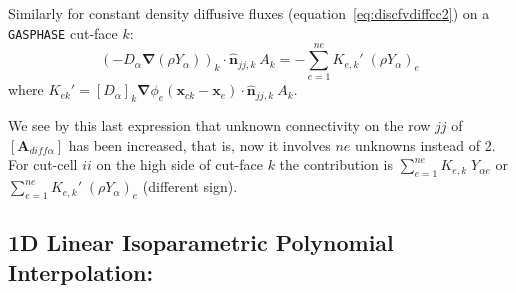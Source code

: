 Similarly for constant density diffusive fluxes (equation~\eqref{eq:discfvdiffcc2}) on a \texttt{GASPHASE} cut-face $k$:
%
\begin{equation}
   \left( - D_\alpha \boldsymbol{\nabla} \left( \rho Y_\alpha \right) \right)_k \cdot \hat{\mathbf{n}}_{jj,k} \: A_k = - \sum^{ne}_{e=1} K_{e,k}' \; \left( \rho Y_{\alpha} \right)_e \label{eq:kekdiff2}
\end{equation}
%
where $K_{ek}' = [D_\alpha]_k \boldsymbol{\nabla} \phi_e(\mathbf{x}_{ck}-\mathbf{x}_e) \cdot \hat{\mathbf{n}}_{jj,k} \: A_k$.

We see by this last expression that unknown connectivity on the row $jj$ of $\left[ \mathbf{A}_{diff \alpha} \right]$ has been increased, that is, now it involves $ne$ unknowns instead of 2. For cut-cell $ii$ on the high side of cut-face $k$ the contribution is $\sum^{ne}_{e=1} K_{e,k} \; Y_{\alpha e}$ or  $\sum^{ne}_{e=1} K_{e,k}' \; \left( \rho Y_{\alpha} \right)_e$ (different sign).


\subsection*{1D Linear Isoparametric Polynomial Interpolation:}

